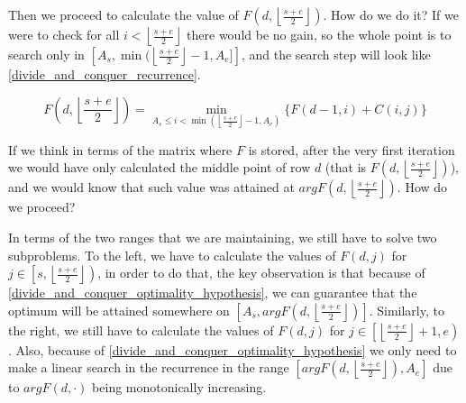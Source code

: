 \documentclass[pdflatex,sn-mathphys]{sn-jnl}%
\theoremstyle{thmstyleone}%
\theoremstyle{thmstyletwo}%
\theoremstyle{thmstylethree}%
\begin{document}
Then we proceed to calculate the value of $F(d, \left \lfloor \frac{s+e}{2}\right \rfloor)$. How do we do it? If we were to check for all $i < \left \lfloor \frac{s+e}{2} \right \rfloor$ there would be no gain, so the whole point is to search only in $\left [A_s, \min(\left \lfloor \frac{s+e}{2}\right \rfloor - 1, A_e]\right ]$, and the search step will look like \ref{divide_and_conquer_recurrence}.

\begin{equation}
    F\left (d, \left \lfloor \frac{s+e}{2}\right \rfloor \right ) = \underset{A_s \leq i < \min(\left \lfloor \frac{s+e}{2}\right \rfloor-1, A_e)}{\min} \{F(d-1, i) + C(i,j)\}
    \label{divide_and_conquer_recurrence}
\end{equation}

If we think in terms of the matrix where $F$ is stored, after the very first iteration we would have only calculated the middle point of row $d$ (that is $F(d, \left \lfloor \frac{s+e}{2} \right \rfloor)$), and we would know that such value was attained at $argF(d, \left \lfloor \frac{s+e}{2} \right \rfloor)$. How do we proceed?

In terms of the two ranges that we are maintaining, we still have to solve two subproblems. To the left, we have to calculate the values of $F(d,j)$ for $j \in \left [s, \left \lfloor \frac{s+e}{2} \right \rfloor \right )$, in order to do that, the key observation is that because of \ref{divide_and_conquer_optimality_hypothesis}, we can guarantee that the optimum will be attained somewhere on $\left [A_s, argF(d,\left \lfloor \frac{s+e}{2} \right \rfloor) \right]$. Similarly, to the right, we still have to calculate the values of $F(d,j)$ for $j \in \left [\left \lfloor \frac{s+e}{2} \right \rfloor + 1, e \right )$. Also, because of \ref{divide_and_conquer_optimality_hypothesis} we only need to make a linear search in the recurrence in the range $\left [argF(d,\left \lfloor \frac{s+e}{2} \right \rfloor), A_e \right ]$ due to $argF(d,\cdot)$ being monotonically increasing.
\end{document}
